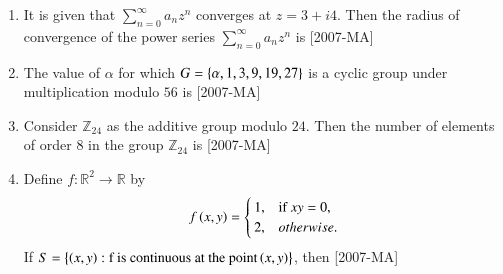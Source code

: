 \documentclass[journal]{IEEEtran}
\begin{document}
\begin{enumerate}
\item It is given that $\sum_{n=0}^{\infty} a_n z^n$ converges at $z=3+i4$. Then the radius of convergence of the power series $\sum_{n=0}^{\infty} a_n z^n$ is \hfill{[2007-MA]}
\begin{enumerate}
\end{enumerate}

\item The value of $\alpha$ for which $G=\left\{\alpha,1,3,9,19,27\right\}$ is a cyclic group under multiplication modulo $56$ is \hfill{[2007-MA]}
\begin{enumerate}
\end{enumerate}

\item Consider $\mathbb Z_{24}$ as the additive group modulo $24$. Then the number of elements of order $8$ in the group $\mathbb Z_{24}$ is \hfill{[2007-MA]}
\begin{enumerate}
\end{enumerate}

\item Define $f: \mathbb R^2 \rightarrow \mathbb R$ by
\begin{align*}
    f\left(x,y\right)= \begin{cases} 
1, & \text{if } xy=0,\\
2, & otherwise. \\
\end{cases}
\end{align*}
If $S=\left\{\left(x,y\right): \text{f is continuous at the point} \left(x,y\right)\right\}$, then \hfill{[2007-MA]}
\begin{enumerate}
\end{enumerate}


\end{enumerate}
\end{document}
